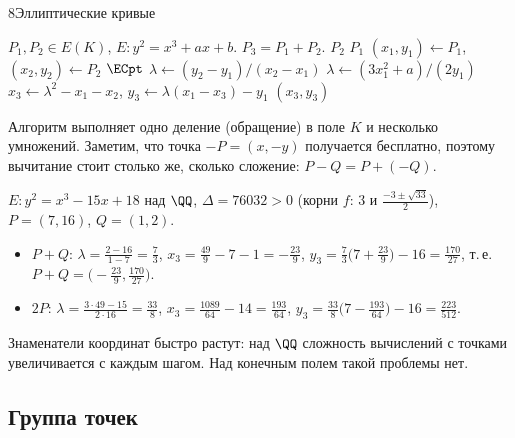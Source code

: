 \begin{lecture}{8}{Эллиптические кривые}
\begin{algorithm}\label{l8:addalg}
\begin{algorithmic}[1]
\Require $P_1, P_2 \in E(K)$, $E\colon y^2 = x^3 + ax + b$.
\Ensure $P_3 = P_1 + P_2$.
 \Return $P_2$ \EndIf
{} \Return $P_1$ \EndIf
\State $(x_1, y_1) \gets P_1$, $(x_2, y_2) \gets P_2$
 \Return $\ECpt$ 
\EndIf
{} \State $\lambda \gets (y_2 - y_1)/(x_2 - x_1)$
\Else \State $\lambda \gets (3x_1^2 + a)/(2y_1)$ \EndIf
\State $x_3 \gets \lambda^2 - x_1 - x_2$, \quad $y_3 \gets \lambda(x_1 - x_3) - y_1$
\State \Return $(x_3, y_3)$
\end{algorithmic}
\end{algorithm}

Алгоритм выполняет одно деление (обращение) в поле $K$ и несколько умножений.
Заметим, что точка $-P = (x, -y)$ получается бесплатно, поэтому вычитание стоит столько же,
сколько сложение: $P - Q = P + (-Q)$.

\begin{example}\label{l8:ex-q}
$E\colon y^2 = x^3 - 15x + 18$ над $\QQ$, $\Delta = 76032 > 0$ (корни $f$: $3$ и
$\frac{-3 \pm \sqrt{33}}{2}$), $P = (7, 16)$, $Q = (1, 2)$.
\begin{itemize}
  \item $P + Q$: $\lambda = \frac{2 - 16}{1 - 7} = \frac73$, $x_3 = \frac{49}{9} - 7 - 1 = -\frac{23}{9}$,
    $y_3 = \frac73\bigl(7 + \frac{23}{9}\bigr) - 16 = \frac{170}{27}$, т.\,е.
    $P + Q = \bigl(-\frac{23}{9}, \frac{170}{27}\bigr)$.
  \item $2P$: $\lambda = \frac{3 \cdot 49 - 15}{2 \cdot 16} = \frac{33}{8}$,
    $x_3 = \frac{1089}{64} - 14 = \frac{193}{64}$,
    $y_3 = \frac{33}{8}\bigl(7 - \frac{193}{64}\bigr) - 16 = \frac{223}{512}$.
\end{itemize}
Знаменатели координат быстро растут: над $\QQ$ сложность вычислений с точками увеличивается
с каждым шагом. Над конечным полем такой проблемы нет.
\end{example}


\subsection{Группа точек}


\end{lecture}
